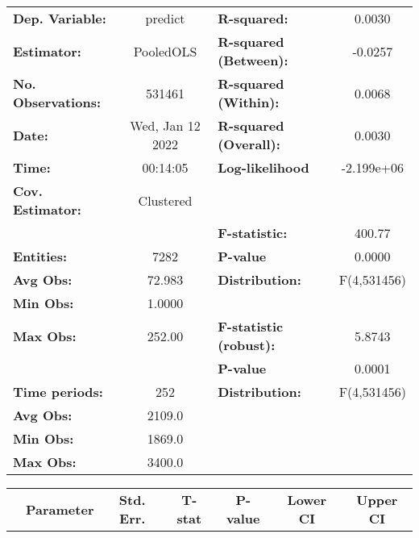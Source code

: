 \begin{center}
\begin{tabular}{lclc}
\toprule
\textbf{Dep. Variable:}    &      predict       & \textbf{  R-squared:         }   &      0.0030      \\
\textbf{Estimator:}        &     PooledOLS      & \textbf{  R-squared (Between):}  &     -0.0257      \\
\textbf{No. Observations:} &       531461       & \textbf{  R-squared (Within):}   &      0.0068      \\
\textbf{Date:}             &  Wed, Jan 12 2022  & \textbf{  R-squared (Overall):}  &      0.0030      \\
\textbf{Time:}             &      00:14:05      & \textbf{  Log-likelihood     }   &    -2.199e+06    \\
\textbf{Cov. Estimator:}   &     Clustered      & \textbf{                     }   &                  \\
\textbf{}                  &                    & \textbf{  F-statistic:       }   &      400.77      \\
\textbf{Entities:}         &        7282        & \textbf{  P-value            }   &      0.0000      \\
\textbf{Avg Obs:}          &       72.983       & \textbf{  Distribution:      }   &   F(4,531456)    \\
\textbf{Min Obs:}          &       1.0000       & \textbf{                     }   &                  \\
\textbf{Max Obs:}          &       252.00       & \textbf{  F-statistic (robust):} &      5.8743      \\
\textbf{}                  &                    & \textbf{  P-value            }   &      0.0001      \\
\textbf{Time periods:}     &        252         & \textbf{  Distribution:      }   &   F(4,531456)    \\
\textbf{Avg Obs:}          &       2109.0       & \textbf{                     }   &                  \\
\textbf{Min Obs:}          &       1869.0       & \textbf{                     }   &                  \\
\textbf{Max Obs:}          &       3400.0       & \textbf{                     }   &                  \\
\bottomrule
\end{tabular}
\begin{tabular}{lcccccc}
                & \textbf{Parameter} & \textbf{Std. Err.} & \textbf{T-stat} & \textbf{P-value} & \textbf{Lower CI} & \textbf{Upper CI}  \\

\end{tabular}
\end{center}
